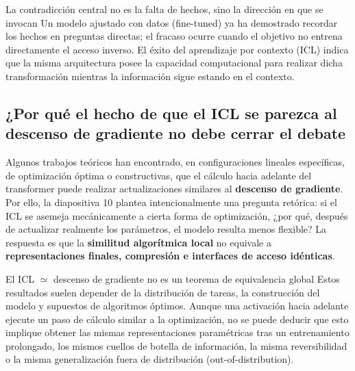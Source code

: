 \begin{importantbox}{La contradicción central no es la falta de hechos, sino la dirección en que se invocan}
Un modelo ajustado con datos (fine-tuned) ya ha demostrado recordar los hechos en preguntas directas; el fracaso ocurre cuando el objetivo no entrena directamente el acceso inverso. El éxito del aprendizaje por contexto (ICL) indica que la misma arquitectura posee la capacidad computacional para realizar dicha transformación mientras la información sigue estando en el contexto.
\end{importantbox}

\subsection{¿Por qué el hecho de que el ICL se parezca al descenso de gradiente no debe cerrar el debate}

Algunos trabajos teóricos han encontrado, en configuraciones lineales específicas, de optimización óptima o constructivas, que el cálculo hacia adelante del transformer puede realizar actualizaciones similares al \textbf{descenso de gradiente}. Por ello, la diapositiva 10 plantea intencionalmente una pregunta retórica: si el ICL se asemeja mecánicamente a cierta forma de optimización, ¿por qué, después de actualizar realmente los parámetros, el modelo resulta menos flexible? La respuesta es que la \textbf{similitud algorítmica local} no equivale a \textbf{representaciones finales, compresión e interfaces de acceso idénticas}.



\begin{warningbox}{El ICL $\simeq$ descenso de gradiente no es un teorema de equivalencia global}
Estos resultados suelen depender de la distribución de tareas, la construcción del modelo y supuestos de algoritmos óptimos. Aunque una activación hacia adelante ejecute un paso de cálculo similar a la optimización, no se puede deducir que esto implique obtener las mismas representaciones paramétricas tras un entrenamiento prolongado, los mismos cuellos de botella de información, la misma reversibilidad o la misma generalización fuera de distribución (out-of-distribution).
\end{warningbox}

